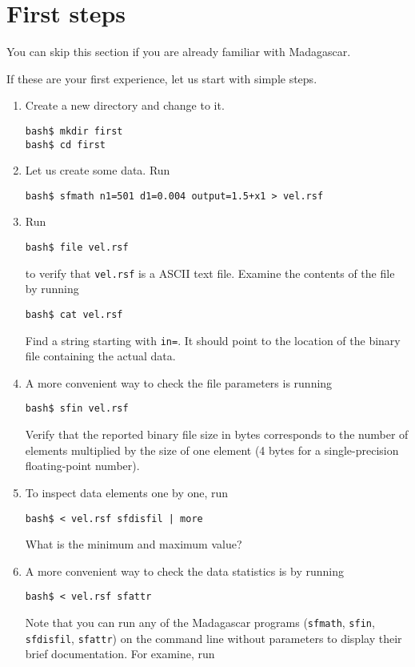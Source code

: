 \section{First steps}

You can skip this section if you are already familiar with Madagascar.

If these are your first experience, let us start with simple steps.

\begin{enumerate}
\item Create a new directory and change to it.
\begin{verbatim}
bash$ mkdir first
bash$ cd first
\end{verbatim}
\item Let us create some data. Run
\begin{verbatim}
bash$ sfmath n1=501 d1=0.004 output=1.5+x1 > vel.rsf
\end{verbatim}
\item Run 
\begin{verbatim}
bash$ file vel.rsf
\end{verbatim}
to verify that \texttt{vel.rsf} is a ASCII text file. Examine the contents of the file by running
\begin{verbatim}
bash$ cat vel.rsf
\end{verbatim}
Find a string starting with \texttt{in=}. It should point to the location of the binary file containing the actual data. 
\item A more convenient way to check the file parameters is running
\begin{verbatim}
bash$ sfin vel.rsf
\end{verbatim}
Verify that the reported binary file size in bytes corresponds to the number of elements multiplied by the size of one element (4 bytes for a single-precision floating-point number).
\item To inspect data elements one by one, run
\begin{verbatim}
bash$ < vel.rsf sfdisfil | more
\end{verbatim}
What is the minimum and maximum value?
\item A more convenient way to check the data statistics is by running
\begin{verbatim}
bash$ < vel.rsf sfattr
\end{verbatim}
Note that you can run any of the Madagascar programs (\texttt{sfmath}, \texttt{sfin}, \texttt{sfdisfil}, \texttt{sfattr}) on the command line without parameters to display their brief documentation. For examine, run

\end{enumerate}
